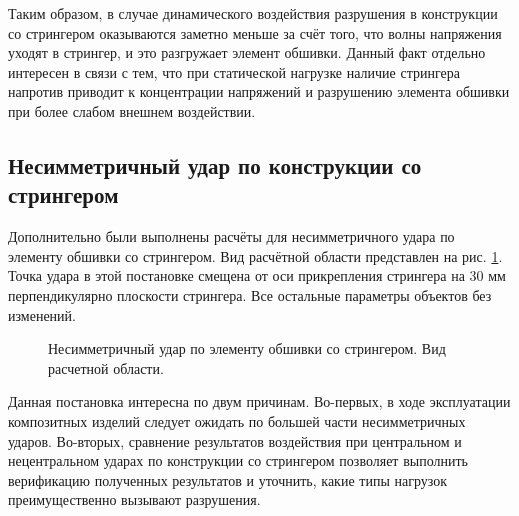 Таким образом, в случае динамического воздействия разрушения в конструкции со стрингером оказываются заметно меньше за счёт того, что волны напряжения уходят в стрингер, и это разгружает элемент обшивки. Данный факт отдельно интересен в связи с тем, что при статической нагрузке наличие стрингера напротив приводит к концентрации напряжений и разрушению элемента обшивки при более слабом внешнем воздействии.


\clearpage
\newpage

\subsection{Несимметричный удар по конструкции со стрингером}

Дополнительно были выполнены расчёты для несимметричного удара по элементу обшивки со стрингером. Вид расчётной области представлен на рис. \ref{pic:wing_stringer_non_center_scene}. Точка удара в этой постановке смещена от оси прикрепления стрингера на 30 мм перпендикулярно плоскости стрингера. Все остальные параметры объектов без изменений.

\begin{figure}[htp]
\caption{Несимметричный удар по элементу обшивки со стрингером. Вид расчетной области.}
\label{pic:wing_stringer_non_center_scene}
\end{figure}

Данная постановка интересна по двум причинам. Во-первых, в ходе эксплуатации композитных изделий следует ожидать по большей части несимметричных ударов. Во-вторых, сравнение результатов воздействия при центральном и нецентральном ударах по конструкции со стрингером позволяет выполнить верификацию полученных результатов и уточнить, какие типы нагрузок преимущественно вызывают разрушения.

